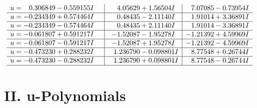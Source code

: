 \documentclass[1p]{elsarticle_modified}
\theoremstyle{definition}
\begin{document}
$$\begin{array}{c|c|c}
\begin{aligned}
u &= \phantom{-}0.306849 - 0.559155 I\end{aligned}
 & \phantom{-}4.05629 + 1.56504 I & \phantom{-}7.07085 - 0.73954 I \\ \hline\begin{aligned}
u &= -0.234349 + 0.574464 I\end{aligned}
 & \phantom{-}0.48435 - 2.11140 I & \phantom{-}1.91014 + 3.36891 I \\ \hline\begin{aligned}
u &= -0.234349 - 0.574464 I\end{aligned}
 & \phantom{-}0.48435 + 2.11140 I & \phantom{-}1.91014 - 3.36891 I \\ \hline\begin{aligned}
u &= -0.061807 + 0.591217 I\end{aligned}
 & -1.52087 - 1.95278 I & -1.21392 + 4.59969 I \\ \hline\begin{aligned}
u &= -0.061807 - 0.591217 I\end{aligned}
 & -1.52087 + 1.95278 I & -1.21392 - 4.59969 I \\ \hline\begin{aligned}
u &= -0.473230 + 0.288232 I\end{aligned}
 & \phantom{-}1.236790 - 0.098801 I & \phantom{-}8.77548 + 0.26744 I \\ \hline\begin{aligned}
u &= -0.473230 - 0.288232 I\end{aligned}
 & \phantom{-}1.236790 + 0.098801 I & \phantom{-}8.77548 - 0.26744 I\\
 \hline 
 \end{array}$$\newpage
\newpage\renewcommand{\arraystretch}{1}
\centering \section*{ II. u-Polynomials}
\end{document}
